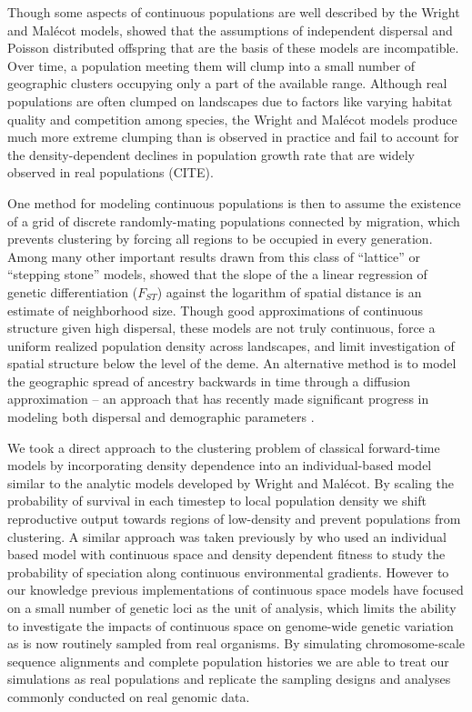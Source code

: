 \documentclass[11pt,twoside,lineno]{preprint}
\begin{document}
Though some aspects of continuous populations are well described by the Wright and Malécot models, \cite{Felsenstein1975} showed that the assumptions of independent dispersal and Poisson distributed offspring that are the basis of these models are incompatible. Over time, a population meeting them will clump into a small number of geographic clusters occupying only a part of the available range. Although real populations are often clumped on landscapes due to factors like varying habitat quality and competition among species, the Wright and Malécot models produce much more extreme clumping than is observed in practice and fail to account for the density-dependent declines in population growth rate that are widely observed in real populations (CITE). 

One method for modeling continuous populations is then to assume the existence of a grid of discrete randomly-mating populations connected by migration, which prevents clustering by forcing all regions to be occupied in every generation. Among many other important results drawn from this class of ``lattice'' or ``stepping stone'' models, \cite{Rousset1997} showed that the slope of the a linear regression of genetic differentiation ($F_{ST}$) against the logarithm of spatial distance is an estimate of neighborhood size. Though good approximations of continuous structure given high dispersal, these models are not truly continuous, force a uniform realized population density across landscapes, and limit investigation of spatial structure below the level of the deme. An alternative method is to model the geographic spread of ancestry backwards in time through a diffusion approximation -- an approach that has recently made significant progress in modeling both dispersal and demographic parameters \citep{Barton2010,Kelleher2014,Ringbauer2017,Ringbauer2018}.

We took a direct approach to the clustering problem of classical forward-time models by incorporating density dependence into an individual-based model similar to the analytic models developed by Wright and Malécot. By scaling the probability of survival in each timestep to local population density we shift reproductive output towards regions of low-density and prevent populations from clustering. A similar approach was taken previously by \citep{Doebeli2003} who used an individual based model with continuous space and density dependent fitness to study the probability of speciation along continuous environmental gradients. However to our knowledge previous implementations of continuous space models have focused on a small number of genetic loci as the unit of analysis, which limits the ability to investigate the impacts of continuous space on genome-wide genetic variation as is now routinely sampled from real organisms. By simulating chromosome-scale sequence alignments and complete population histories we are able to treat our simulations as real populations and replicate the sampling designs and analyses commonly conducted on real genomic data.
\end{document}
